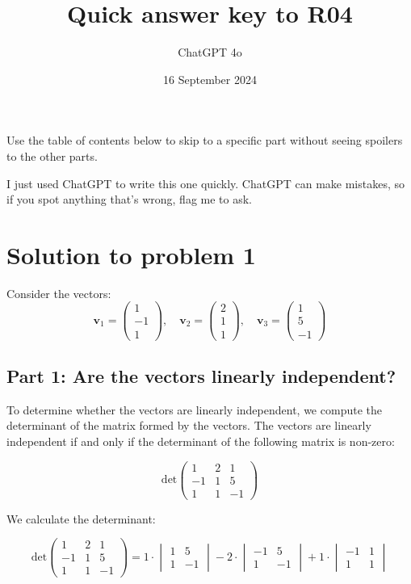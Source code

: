 \documentclass[11pt]{article}
\begin{document}
\title{Quick answer key to R04}
\author{ChatGPT 4o}
\date{16 September 2024}
\maketitle

Use the table of contents below to skip to a specific part
without seeing spoilers to the other parts.

I just used ChatGPT to write this one quickly.
ChatGPT can make mistakes, so if you spot anything that's wrong, flag me to ask.

\tableofcontents


\newpage

\section{Solution to problem 1}

Consider the vectors:
\[
\mathbf{v}_1 = \begin{pmatrix} 1 \\ -1 \\ 1 \end{pmatrix}, \quad \mathbf{v}_2 = \begin{pmatrix} 2 \\ 1 \\ 1 \end{pmatrix}, \quad \mathbf{v}_3 = \begin{pmatrix} 1 \\ 5 \\ -1 \end{pmatrix}
\]

\subsection{Part 1: Are the vectors linearly independent?}

To determine whether the vectors are linearly independent, we compute the determinant of the matrix formed by the vectors. The vectors are linearly independent if and only if the determinant of the following matrix is non-zero:

\[
\text{det} \begin{pmatrix}
1 & 2 & 1 \\
-1 & 1 & 5 \\
1 & 1 & -1
\end{pmatrix}
\]

We calculate the determinant:

\[
\text{det} \begin{pmatrix}
1 & 2 & 1 \\
-1 & 1 & 5 \\
1 & 1 & -1
\end{pmatrix}
= 1 \cdot \begin{vmatrix} 1 & 5 \\ 1 & -1 \end{vmatrix} - 2 \cdot \begin{vmatrix} -1 & 5 \\ 1 & -1 \end{vmatrix} + 1 \cdot \begin{vmatrix} -1 & 1 \\ 1 & 1 \end{vmatrix}
\]
\end{document}
